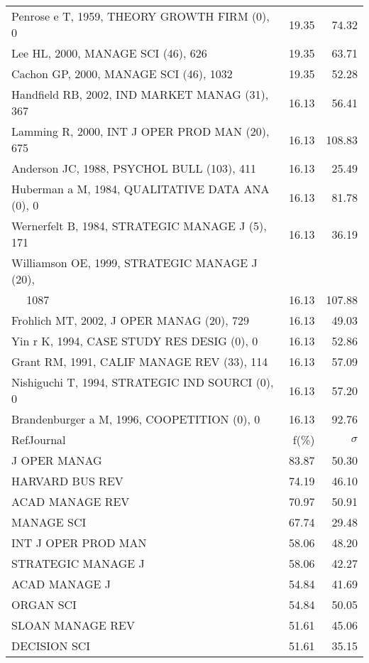 \documentclass[a4paper,11pt]{report}
\begin{document}
\begin{landscape}
\begin{table}[!ht]
{\begin{tabular}{|l r r|}
Penrose e T, 1959, THEORY GROWTH FIRM (0), 0 & 19.35 & 74.32\\
Lee HL, 2000, MANAGE SCI (46), 626 & 19.35 & 63.71\\
Cachon GP, 2000, MANAGE SCI (46), 1032 & 19.35 & 52.28\\
Handfield RB, 2002, IND MARKET MANAG (31), 367 & 16.13 & 56.41\\
Lamming R, 2000, INT J OPER PROD MAN (20), 675 & 16.13 & 108.83\\
Anderson JC, 1988, PSYCHOL BULL (103), 411 & 16.13 & 25.49\\
Huberman a M, 1984, QUALITATIVE DATA ANA (0), 0 & 16.13 & 81.78\\
Wernerfelt B, 1984, STRATEGIC MANAGE J (5), 171 & 16.13 & 36.19\\
Williamson OE, 1999, STRATEGIC MANAGE J (20), &  & \\
$\quad$ 1087 & 16.13 & 107.88\\
Frohlich MT, 2002, J OPER MANAG (20), 729 & 16.13 & 49.03\\
Yin r K, 1994, CASE STUDY RES DESIG (0), 0 & 16.13 & 52.86\\
Grant RM, 1991, CALIF MANAGE REV (33), 114 & 16.13 & 57.09\\
Nishiguchi T, 1994, STRATEGIC IND SOURCI (0), 0 & 16.13 & 57.20\\
Brandenburger a M, 1996, COOPETITION (0), 0 & 16.13 & 92.76\\
\hline
\hline
RefJournal & f(\%) & $\sigma$\\
\hline
J OPER MANAG & 83.87 & 50.30\\
HARVARD BUS REV & 74.19 & 46.10\\
ACAD MANAGE REV & 70.97 & 50.91\\
MANAGE SCI & 67.74 & 29.48\\
INT J OPER PROD MAN & 58.06 & 48.20\\
STRATEGIC MANAGE J & 58.06 & 42.27\\
ACAD MANAGE J & 54.84 & 41.69\\
ORGAN SCI & 54.84 & 50.05\\
SLOAN MANAGE REV & 51.61 & 45.06\\
DECISION SCI & 51.61 & 35.15\\
\hline
\end{tabular}
}
\end{table}

\end{landscape}
\end{document}
